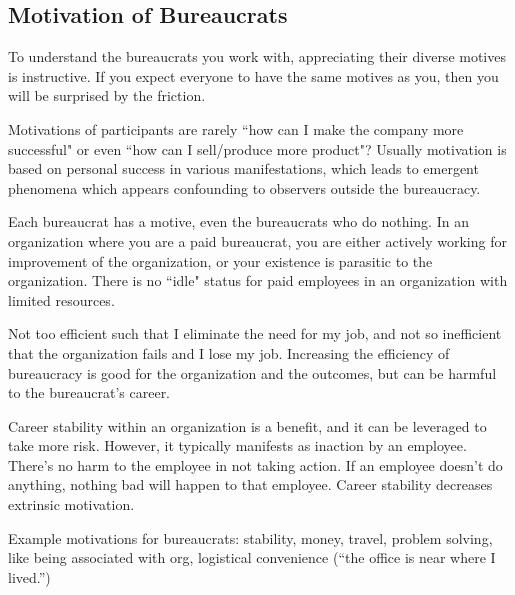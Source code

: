 \subsection{Motivation of Bureaucrats}

To understand the bureaucrats you work with, appreciating their diverse motives is instructive. If you expect everyone to have the same motives as you, then you will be surprised by the friction. 

Motivations of participants are rarely ``how can I make the company more successful" or even ``how can I sell/produce more product"? Usually motivation is based on personal success in various manifestations, which leads to emergent phenomena which appears confounding to observers outside the bureaucracy. 



Each bureaucrat has a motive, even the bureaucrats who do nothing. 
In an organization where you are a paid bureaucrat, you are either actively working for improvement of the organization, or your existence is parasitic to the organization. There is no ``idle" status for paid employees in an organization with limited resources.

Not too efficient such that I eliminate the need for my job, and not so inefficient that the organization fails and I lose my job. Increasing the efficiency of bureaucracy is good for the organization and the outcomes, but can be harmful to the bureaucrat's career.

Career stability within an organization is a benefit, and it can be leveraged to take more risk. However, it typically manifests as inaction by an employee. There's no harm to the employee in not taking action. If an employee doesn't do anything, nothing bad will happen to that employee. Career stability decreases extrinsic motivation.



Example motivations for bureaucrats: stability, money, travel, problem solving, like being associated with org, logistical convenience (``the office is near where I lived.'')

